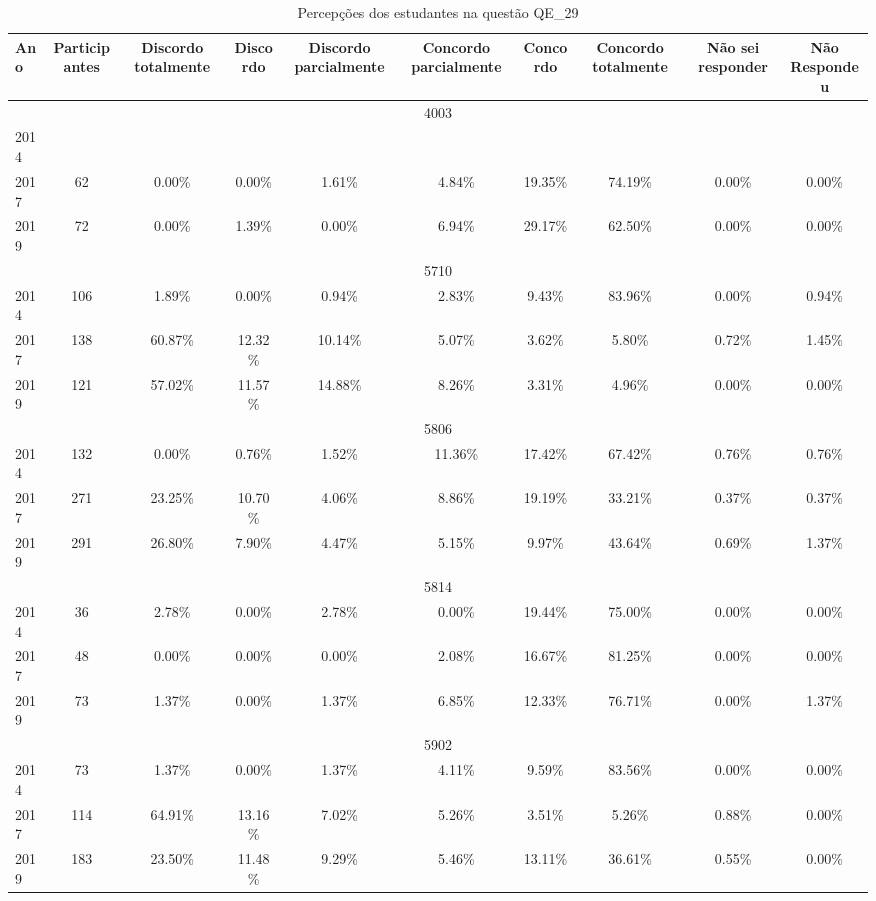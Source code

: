 \begin{table}[H]
\centering
\caption{Percepções dos estudantes na questão QE\_29}
\begin{tabular}{|l|c|ccc|ccc|cc|}
\hline
\toprule
Ano & Participantes & Discordo totalmente & Discordo & Discordo parcialmente & Concordo parcialmente & Concordo & Concordo totalmente & Não sei responder & Não Respondeu \\
\midrule
\hline
\multicolumn{10}{|c|}{4003}\\
\hline
2014 & & & & & & & & & \\
2017 & 62 & 0.00\% & 0.00\% & 1.61\% & 4.84\% & 19.35\% & 74.19\% & 0.00\% & 0.00\%\\
2019 & 72 & 0.00\% & 1.39\% & 0.00\% & 6.94\% & 29.17\% & 62.50\% & 0.00\% & 0.00\%\\
\hline
\hline
\multicolumn{10}{|c|}{5710}\\
\hline
2014 & 106 & 1.89\% & 0.00\% & 0.94\% & 2.83\% & 9.43\% & 83.96\% & 0.00\% & 0.94\%\\
2017 & 138 & 60.87\% & 12.32\% & 10.14\% & 5.07\% & 3.62\% & 5.80\% & 0.72\% & 1.45\%\\
2019 & 121 & 57.02\% & 11.57\% & 14.88\% & 8.26\% & 3.31\% & 4.96\% & 0.00\% & 0.00\%\\
\hline
\hline
\multicolumn{10}{|c|}{5806}\\
\hline
2014 & 132 & 0.00\% & 0.76\% & 1.52\% & 11.36\% & 17.42\% & 67.42\% & 0.76\% & 0.76\%\\
2017 & 271 & 23.25\% & 10.70\% & 4.06\% & 8.86\% & 19.19\% & 33.21\% & 0.37\% & 0.37\%\\
2019 & 291 & 26.80\% & 7.90\% & 4.47\% & 5.15\% & 9.97\% & 43.64\% & 0.69\% & 1.37\%\\
\hline
\hline
\multicolumn{10}{|c|}{5814}\\
\hline
2014 & 36 & 2.78\% & 0.00\% & 2.78\% & 0.00\% & 19.44\% & 75.00\% & 0.00\% & 0.00\%\\
2017 & 48 & 0.00\% & 0.00\% & 0.00\% & 2.08\% & 16.67\% & 81.25\% & 0.00\% & 0.00\%\\
2019 & 73 & 1.37\% & 0.00\% & 1.37\% & 6.85\% & 12.33\% & 76.71\% & 0.00\% & 1.37\%\\
\hline
\hline
\multicolumn{10}{|c|}{5902}\\
\hline
2014 & 73 & 1.37\% & 0.00\% & 1.37\% & 4.11\% & 9.59\% & 83.56\% & 0.00\% & 0.00\%\\
2017 & 114 & 64.91\% & 13.16\% & 7.02\% & 5.26\% & 3.51\% & 5.26\% & 0.88\% & 0.00\%\\
2019 & 183 & 23.50\% & 11.48\% & 9.29\% & 5.46\% & 13.11\% & 36.61\% & 0.55\% & 0.00\%\\

\end{tabular}
\end{table}
